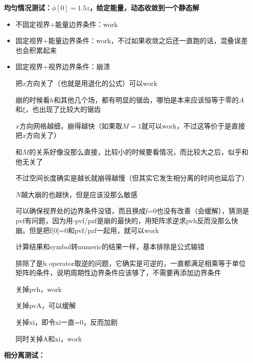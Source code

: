 \documentclass[12pt,a4paper]{ctexart}
\numberwithin{equation}{section}
\begin{document}
\textbf{均匀情况测试：$\phi[0]=1.5z$，给定能量，动态收敛到一个静态解}

\begin{itemize}
    \item 不固定视界+能量边界条件：work
    \item 固定视界+能量边界条件：work，不过如果收敛之后还一直跑的话，混叠误差也会积累起来
    \item 固定视界+视界边界条件：崩溃
    
    把$x$方向关了（也就是用退化的公式）可以work

    崩的时候看$h$和其他几个场，都有明显的锯齿，哪怕是本来应该恒等于零的$A$和$\xi$，也出现了比较大的锯齿

    $x$方向网格越细，崩得越快（如果取$M=1$就可以work，不过这等价于是直接把$x$方向关了）

    和$M$的关系好像没那么直接，比较小的时候要看情况，而比较大之后，似乎和他无关了

    不过空间长度确实是越长就崩得越慢（但其实它发生相分离的时间也延后了）

    $N$越大崩的也越快，但是应该没那么敏感
    
    可以确保视界处的边界条件没错，而且换成f=0也没有改善（会缓解），猜测是pvf有问题，因为用-pvf/pzf是崩的最快的，用矩阵求逆求pvh反而没那么快崩。但是把f[0]=0和pvf/pzf一起用，就可以work

    计算结果和symbol转numeric的结果一样，基本排除是公式输错

    排除了是h operator取逆的问题，它确实是可逆的，一直都满足相乘等于单位矩阵的条件，说明周期性边界条件应该够了，不需要再添加边界条件

    关掉pvh，work

    关掉pvA，可以缓解

    关掉xi，即令xi一直=0，反而加剧

    同时关掉A和xi，work
\end{itemize}

\textbf{相分离测试：}
\end{document}
